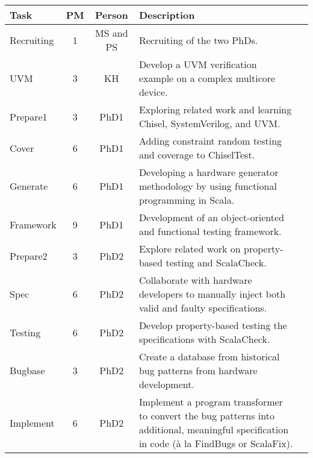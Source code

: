 \documentclass[fleqn,12pt]{article}
\begin{document}
\begin{table*}%
{\small
  \begin{center}
    \begin{tabular}{lccp{110mm}l}
      \toprule
      Task                   & PM  & Person    & Description                                                                                   \\
      \midrule
      Recruiting             & 1   & MS and PS & Recruiting of the two PhDs.                                                                    \\
      \midrule
      UVM                    & 3   & KH        & Develop a UVM verification example on a complex multicore device.          \\
      Prepare1                & 3   & PhD1      & Exploring related work and learning Chisel, SystemVerilog, and UVM.                           \\
      Cover                  & 6   & PhD1      & Adding constraint random testing and coverage to ChiselTest.                     \\
      Generate               & 6   & PhD1      & Developing a hardware generator methodology by using functional programming in Scala.         \\
      Framework              & 9   & PhD1      & Development of an object-oriented and functional testing framework.                      \\
      \midrule
      Prepare2                    & 3   & PhD2      & Explore related work on property-based testing and ScalaCheck.                   \\
      Spec          & 6   & PhD2      & Collaborate with hardware developers to manually inject both valid and faulty specifications. \\
      Testing & 6   & PhD2      & Develop property-based testing the specifications with ScalaCheck.                                                      \\
      Bugbase           & 3   & PhD2      & Create a database from historical bug patterns from hardware development.                   \\
      Implement              & 6   & PhD2      & Implement a program transformer to convert the bug patterns into %
  additional, meaningful  specification in code (\`a la FindBugs or ScalaFix).                                                                 \\

\end{tabular}
\end{center}}
\end{table*}
\end{document}
